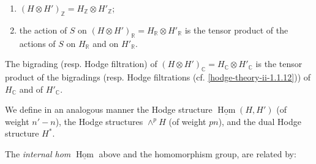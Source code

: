     
 \begin{enumerate}
      
 \item[(a)]
        \((H\otimes  H')_\mathbb {Z}=H_\mathbb {Z}\otimes  H'_\mathbb {Z}\);
      

      
 \item[(b)]
        the action of \(S\) on \((H\otimes  H')_\mathbb {R}=H_\mathbb {R}\otimes  H'_\mathbb {R}\) is the tensor product of the actions of \(S\) on \(H_\mathbb {R}\) and on \(H'_\mathbb {R}\).
      

    \end{enumerate}\par{}The bigrading (resp. Hodge filtration) of \((H\otimes  H')_\mathbb {C}=H_\mathbb {C}\otimes  H'_\mathbb {C}\) is the tensor product of the bigradings (resp. Hodge filtrations (cf. \cref{hodge-theory-ii-1.1.12})) of \(H_\mathbb {C}\) and of \(H'_\mathbb {C}\).\par{}We define in an analogous manner the Hodge structure \(\underline {\operatorname {Hom}}(H,H')\) (of weight \(n'-n\)), the Hodge structures \(\wedge ^p H\) (of weight \(pn\)), and the dual Hodge structure \(H^*\).\par{}The \emph{internal hom} \(\underline {\operatorname {Hom}}\) above and the homomorphism group, are related by:

